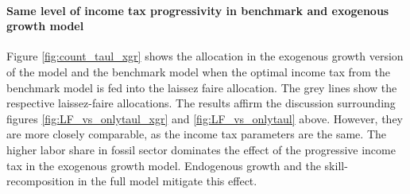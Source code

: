 \paragraph{Same level of income tax progressivity in benchmark and exogenous growth model}
Figure \ref{fig:count_taul_xgr} shows the allocation in the exogenous growth version of the model and the benchmark model when the optimal income tax from the benchmark model is fed into the laissez faire allocation. The grey lines show the respective laissez-faire allocations. 
The results affirm the discussion surrounding figures \ref{fig:LF_vs_onlytaul_xgr} and \ref{fig:LF_vs_onlytaul} above. However, they are more closely comparable, as the income tax parameters are the same.
 The higher labor share in fossil sector dominates the effect of the progressive income tax in the exogenous growth model. Endogenous growth and the skill-recomposition in the full model mitigate this effect. 
